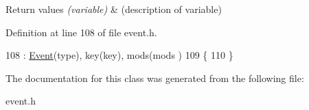 \begin{DoxyRetVals}{Return values}
{\em (variable)} & (description of variable) \\
\hline
\end{DoxyRetVals}


Definition at line 108 of file event.\+h.


\begin{DoxyCode}
108                                                                     : \hyperlink{classEvent}{Event}(type), key(key), mods(mods
      )
109     \{
110     \}
\end{DoxyCode}


The documentation for this class was generated from the following file\+:\begin{DoxyCompactItemize}
\item 
event.\+h\end{DoxyCompactItemize}
